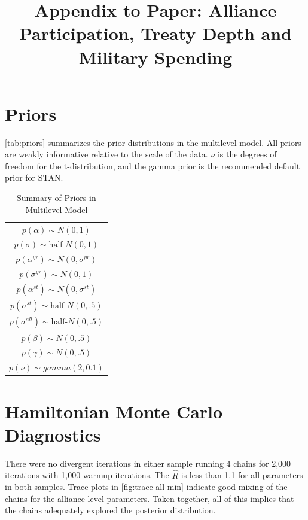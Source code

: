 \documentclass[12pt]{article}
\title{\textbf{Appendix to Paper: Alliance Participation, Treaty Depth and Military Spending}}
\date{}
\begin{document}
\maketitle 

\doublespace 



\section{Priors}

\autoref{tab:priors} summarizes the prior distributions in the multilevel model. 
All priors are weakly informative relative to the scale of the data. 
$\nu$ is the degrees of freedom for the t-distribution, and the gamma prior is the recommended default prior for STAN. 

\begin{table} %
\begin{center}
\begin{tabular}{c} 
$ p(\alpha) \sim N(0, 1)$  \\
$ p(\sigma) \sim \mbox{half-}N(0, 1) $ \\
$ p(\alpha^{yr}) \sim N(0, \sigma^{yr}) $ \\ 
$ p(\sigma^{yr}) \sim N(0, 1) $ \\
$ p(\alpha^{st}) \sim N(0, \sigma^{st}) $ \\ 
$ p(\sigma^{st}) \sim \mbox{half-}N(0, .5) $ \\ 
$ p(\sigma^{all}) \sim \mbox{half-}N(0, .5) $ \\
$ p(\beta) \sim N(0, .5) $ \\
$ p(\gamma) \sim N(0, .5) $ \\ 
$ p(\nu) \sim gamma(2, 0.1)$ 
\end{tabular} 
\caption{Summary of Priors in Multilevel Model} 
\label{tab:priors}
\end{center} 
\end{table} 


\section{Hamiltonian Monte Carlo Diagnostics}

There were no divergent iterations in either sample running 4 chains for 2,000 iterations with 1,000 warmup iterations. 
The $\hat{R}$ is less than 1.1 for all parameters in both samples. 
Trace plots in \autoref{fig:trace-all-min} indicate good mixing of the chains for the alliance-level parameters. 
Taken together, all of this implies that the chains adequately explored the posterior distribution. 
\end{document}
